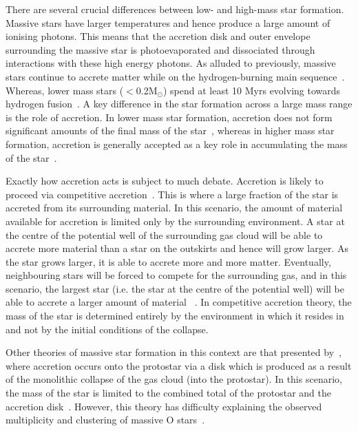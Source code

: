 There are several crucial differences between low- and high-mass star formation.\footnotemark~
Massive stars have larger temperatures and hence produce a large amount of ionising photons.
This means that the accretion disk and outer envelope surrounding the massive star is photoevaporated and dissociated through interactions with these high energy photons.
As alluded to previously, massive stars continue to accrete matter while on the hydrogen-burning main sequence~\citep{Zinnecker07}.
Whereas, lower mass stars ($ < $0.2M$_{\odot}$) spend at least 10 Myrs evolving towards hydrogen fusion~\citep{Luhman12}.
A key difference in the star formation across a large mass range is the role of accretion.
In lower mass star formation, accretion does not form significant amounts of the final mass of the star~\citep{Bonnell08}, whereas in higher mass star formation, accretion is generally accepted as a key role in accumulating the mass of the star~\citep{Kraus10}.


Exactly how accretion acts is subject to much debate.
Accretion is likely to proceed via competitive accretion~\citep{Bonnell01}.
This is where a large fraction of the star is accreted from its surrounding material.
In this scenario, the amount of material available for accretion is limited only by the surrounding environment.
A star at the centre of the potential well of the surrounding gas cloud will be able to accrete more material than a star on the outskirts and hence will grow larger.
As the star grows larger, it is able to accrete more and more matter.
Eventually, neighbouring stars will be forced to compete for the surrounding gas, and in this scenario, the largest star (i.e. the star at the centre of the potential well) will be able to accrete a larger amount of material ~\citep[for a useful economical analogy, see Section 4.2 of][]{Zinnecker07}.
In competitive accretion theory, the mass of the star is determined entirely by the environment in which it resides in and not by the initial conditions of the collapse.

Other theories of massive star formation in this context are that presented by~\cite{Yorke02}, where accretion occurs onto the protostar via a disk which is produced as a result of the monolithic collapse of the gas cloud (into the protostar).
In this scenario, the mass of the star is limited to the combined total of the protostar and the accretion disk~\citep{Zinnecker07}.
However, this theory has difficulty explaining the observed multiplicity and clustering of massive O stars~\citep{Zinnecker07, Sana12, Kennicutt12}.

